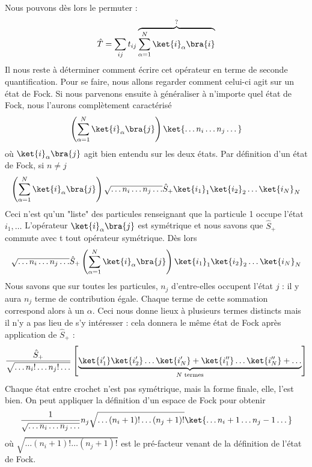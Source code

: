 Nous pouvons dès lors le permuter :
\begin{equation}
\hat{T} = \sum_{ij} t_{ij}\overbrace{\sum_{\alpha=1}^N \ket{i}_\alpha\bra{i}}^{?}
\end{equation}
Il nous reste à déterminer comment écrire cet opérateur en terme de seconde quantification. Pour se faire, nous allons
regarder comment celui-ci agit sur un état de Fock. Si nous parvenons ensuite à généraliser à n'importe quel état de 
Fock, nous l'aurons complètement caractérisé 
\begin{equation}
\left( \sum_{\alpha=1}^N \ket{i}_\alpha\bra{j}\right)\ket{\dots n_i\dots n_j\dots}
\end{equation}
où $\ket{i}_\alpha\bra{j}$ agit bien entendu sur les deux états. Par définition d'un état de Fock, si 
$n\neq j$
\begin{equation}
\left( \sum_{\alpha=1}^N \ket{i}_\alpha\bra{j}\right)\sqrt{\dots n_i\dots n_j\dots}\hat{S}_+
\ket{i_1}_1\ket{i_2}_2\dots\ket{i_N}_N
\end{equation}
Ceci n'est qu'un "liste" des particules renseignant que la particule 1 occupe l'état $i_1,\dots$ 
L'opérateur $\ket{i}_\alpha\bra{j}$ est symétrique et nous savons que $\hat{S}_+$ commute avec t
tout opérateur symétrique. Dès lors
\begin{equation}
\sqrt{\dots n_i\dots n_j\dots}\hat{S}_+\left( \sum_{\alpha=1}^N \ket{i}_\alpha\bra{j}\right)
\ket{i_1}_1\ket{i_2}_2\dots\ket{i_N}_N
\end{equation}
Nous savons que sur toutes les particules, $n_j$ d'entre-elles occupent l'état $j$ : il y aura 
$n_j$ terme de contribution égale. Chaque terme de cette sommation correspond alors à un $\alpha$. 
Ceci nous donne lieux à plusieurs termes distincts mais il n'y a pas lieu de s'y intéresser : cela 
donnera le même état de Fock après application de $\hat{S}_+$ :
\begin{equation}
\dfrac{\hat{S}_+}{\sqrt{\dots n_i!\dots n_j!\dots}}\left[\underbrace{\ket{i_1'}\ket{i_2'}\dots \ket{i_N'}+ 
\ket{i_1''}\dots \ket{i_N''}+\dots}_{N\text{ termes}}\right]
\end{equation}
Chaque état entre crochet n'est pas symétrique, mais la forme finale, elle, l'est bien. On peut 
appliquer la définition d'un espace de Fock pour obtenir
\begin{equation}
\dfrac{1}{\sqrt{\dots n_i\dots n_j\dots}}n_j\sqrt{\dots (n_i+1)!\dots (n_j+1)!}\ket{\dots n_i+1\dots 
n_j-1\dots}
\end{equation}
où $\sqrt{\dots (n_i+1)!\dots (n_j+1)!}$ est le pré-facteur venant de la définition de l'état de Fock.
